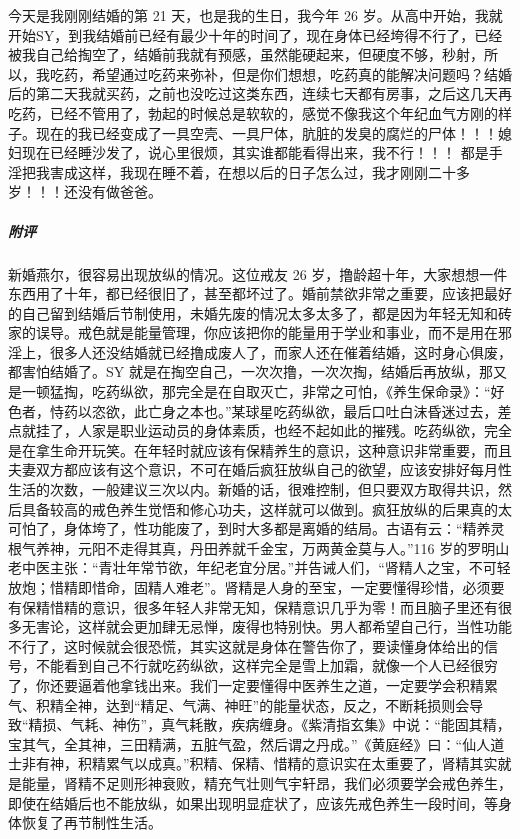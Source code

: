 \begin{case}
    今天是我刚刚结婚的第 21 天，也是我的生日，我今年 26 岁。从高中开始，我就开始SY，到我结婚前已经有最少十年的时间了，现在身体已经垮得不行了，已经被我自己给掏空了，结婚前我就有预感，虽然能硬起来，但硬度不够，秒射，所以，我吃药，希望通过吃药来弥补，但是你们想想，吃药真的能解决问题吗？结婚后的第二天我就买药，之前也没吃过这类东西，连续七天都有房事，之后这几天再吃药，已经不管用了，勃起的时候总是软软的，感觉不像我这个年纪血气方刚的样子。现在的我已经变成了一具空壳、一具尸体，肮脏的发臭的腐烂的尸体！！！媳妇现在已经睡沙发了，说心里很烦，其实谁都能看得出来，我不行！！！ 都是手淫把我害成这样，我现在睡不着，在想以后的日子怎么过，我才刚刚二十多岁！！！还没有做爸爸。
    \subparagraph{附评} 新婚燕尔，很容易出现放纵的情况。这位戒友 26 岁，撸龄超十年，大家想想一件东西用了十年，都已经很旧了，甚至都坏过了。婚前禁欲非常之重要，应该把最好的自己留到结婚后节制使用，未婚先废的情况太多太多了，都是因为年轻无知和砖家的误导。戒色就是能量管理，你应该把你的能量用于学业和事业，而不是用在邪淫上，很多人还没结婚就已经撸成废人了，而家人还在催着结婚，这时身心俱废，都害怕结婚了。SY 就是在掏空自己，一次次撸，一次次掏，结婚后再放纵，那又是一顿猛掏，吃药纵欲，那完全是在自取灭亡，非常之可怕，《养生保命录》：“好色者，恃药以恣欲，此亡身之本也。”某球星吃药纵欲，最后口吐白沫昏迷过去，差点就挂了，人家是职业运动员的身体素质，也经不起如此的摧残。吃药纵欲，完全是在拿生命开玩笑。在年轻时就应该有保精养生的意识，这种意识非常重要，而且夫妻双方都应该有这个意识，不可在婚后疯狂放纵自己的欲望，应该安排好每月性生活的次数，一般建议三次以内。新婚的话，很难控制，但只要双方取得共识，然后具备较高的戒色养生觉悟和修心功夫，这样就可以做到。疯狂放纵的后果真的太可怕了，身体垮了，性功能废了，到时大多都是离婚的结局。古语有云：“精养灵根气养神，元阳不走得其真，丹田养就千金宝，万两黄金莫与人。”116 岁的罗明山老中医主张：“青壮年常节欲，年纪老宜分居。”并告诫人们，“肾精人之宝，不可轻放炮；惜精即惜命，固精人难老”。肾精是人身的至宝，一定要懂得珍惜，必须要有保精惜精的意识，很多年轻人非常无知，保精意识几乎为零！而且脑子里还有很多无害论，这样就会更加肆无忌惮，废得也特别快。男人都希望自己行，当性功能不行了，这时候就会很恐慌，其实这就是身体在警告你了，要读懂身体给出的信号，不能看到自己不行就吃药纵欲，这样完全是雪上加霜，就像一个人已经很穷了，你还要逼着他拿钱出来。我们一定要懂得中医养生之道，一定要学会积精累气、积精全神，达到“精足、气满、神旺”的能量状态，反之，不断耗损则会导致“精损、气耗、神伤”，真气耗散，疾病缠身。《紫清指玄集》中说：“能固其精，宝其气，全其神，三田精满，五脏气盈，然后谓之丹成。”《黄庭经》曰：“仙人道士非有神，积精累气以成真。”积精、保精、惜精的意识实在太重要了，肾精其实就是能量，肾精不足则形神衰败，精充气壮则气宇轩昂，我们必须要学会戒色养生，即使在结婚后也不能放纵，如果出现明显症状了，应该先戒色养生一段时间，等身体恢复了再节制性生活。
\end{case}

